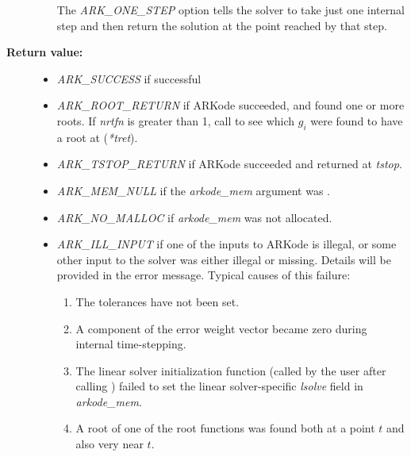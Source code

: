 \documentclass[letterpaper,10pt,english]{sphinxmanual}
\begin{document}
\begin{fulllineitems}
\begin{description}
\begin{itemize}
The \emph{ARK\_ONE\_STEP} option tells the solver to take just one
internal step and then return the solution at the point
reached by that step.

\end{itemize}

\item[{\textbf{Return value:}}] \leavevmode\begin{itemize}
\item {} 
\emph{ARK\_SUCCESS} if successful

\item {} 
\emph{ARK\_ROOT\_RETURN} if ARKode succeeded, and found one or more roots.
If \emph{nrtfn} is greater than 1, call {\hyperref[c_interface/User_callable:c.ARKodeGetRootInfo]{\emph{}}} to see
which \(g_i\) were found to have a root at (\emph{*tret}).

\item {} 
\emph{ARK\_TSTOP\_RETURN} if ARKode succeeded and returned at \emph{tstop}.

\item {} 
\emph{ARK\_MEM\_NULL} if the \emph{arkode\_mem} argument was .

\item {} 
\emph{ARK\_NO\_MALLOC} if \emph{arkode\_mem} was not allocated.

\item {} 
\emph{ARK\_ILL\_INPUT} if one of the inputs to ARKode is illegal, or
some other input to the solver was either illegal or missing.
Details will be provided in the error message.  Typical causes
of this failure:
\begin{enumerate}
\item {} 
The tolerances have not been set.

\item {} 
A component of the error weight vector became zero during
internal time-stepping.

\item {} 
The linear solver initialization function (called by the
user after calling {\hyperref[c_interface/User_callable:c.ARKodeCreate]{\emph{}}}) failed to set
the linear solver-specific \emph{lsolve} field in
\emph{arkode\_mem}.

\item {} 
A root of one of the root functions was found both at a
point \(t\) and also very near \(t\).

\end{enumerate}


\end{itemize}
\end{description}
\end{fulllineitems}
\end{document}
